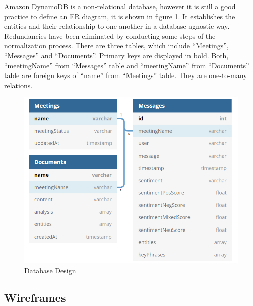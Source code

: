 \documentclass{article}
\begin{document}
{\large
Amazon DynamoDB is a non-relational database, however it is still a good practice to define an ER diagram, it is shown in figure \ref{fig:Database Design}. It establishes the entities and their relationship to one another in a database-agnostic way. Redundancies have been eliminated by conducting some steps of the normalization process. There are three tables, which include ``Meetings'', ``Messages'' and ``Documents''. Primary keys are displayed in bold. Both, ``meetingName'' from ``Messages'' table and ``meetingName'' from ``Documents'' table are foreign keys of ``name'' from ``Meetings'' table. They are one-to-many relations.\par
}
\vspace{10pt}
\begin{figure}[H]
  \centering
  \includegraphics[scale=0.7]{img/dbdesign.png}
  \caption{Database Design}
  \label{fig:Database Design}
\end{figure}

\subsection{Wireframes}
\end{document}
